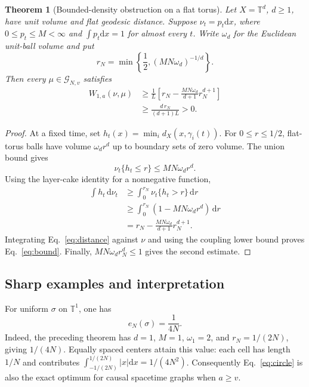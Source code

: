 \documentclass[aip,jmp,reprint,onecolumn,amsmath,amssymb]{revtex4-2}
\newcommand{\dd}{\mathrm{d}}
\newcommand{\T}{\mathbb T}
\newcommand{\G}{\mathcal G}
\newtheorem{theorem}{Theorem}[section]
\theoremstyle{definition}
\begin{document}
\begin{theorem}[Bounded-density obstruction on a flat torus]
Let $X=\T^d$, $d\ge1$, have unit volume and flat geodesic distance. Suppose $\nu_t=p_t\dd x$, where $0\le p_t\le M<\infty$ and $\int p_t\dd x=1$ for almost every $t$. Write $\omega_d$ for the Euclidean unit-ball volume and put
\begin{equation}
 r_N=\min\left\{\frac12,(MN\omega_d)^{-1/d}\right\}.
\end{equation}
Then every $\mu\in\G_{N,v}$ satisfies
\begin{align}
 W_{1,a}(\nu,\mu)
 &\ge\frac1L\left[r_N-\frac{MN\omega_d}{d+1}r_N^{d+1}\right]\label{eq:bound}\\
 &\ge\frac{d\,r_N}{(d+1)L}>0.
\end{align}
\end{theorem}
\begin{proof}
At a fixed time, set $h_t(x)=\min_i d_X(x,\gamma_i(t))$. For $0\le r\le1/2$, flat-torus balls have volume $\omega_dr^d$ up to boundary sets of zero volume. The union bound gives
\begin{equation}
 \nu_t\{h_t\le r\}\le MN\omega_dr^d.
\end{equation}
Using the layer-cake identity for a nonnegative function,
\begin{align}
 \int h_t\,\dd\nu_t
 &\ge\int_0^{r_N}\nu_t\{h_t>r\}\,\dd r\\
 &\ge\int_0^{r_N}(1-MN\omega_dr^d)\,\dd r\\
 &=r_N-\frac{MN\omega_d}{d+1}r_N^{d+1}.
\end{align}
Integrating Eq.~\eqref{eq:distance} against $\nu$ and using the coupling lower bound proves Eq.~\eqref{eq:bound}. Finally, $MN\omega_dr_N^d\le1$ gives the second estimate.
\end{proof}

\subsection{Sharp examples and interpretation}
For uniform $\sigma$ on $\T^1$, one has
\begin{equation}
 e_N(\sigma)=\frac1{4N}.
 \label{eq:circle}
\end{equation}
Indeed, the preceding theorem has $d=1$, $M=1$, $\omega_1=2$, and $r_N=1/(2N)$, giving $1/(4N)$. Equally spaced centers attain this value: each cell has length $1/N$ and contributes $\int_{-1/(2N)}^{1/(2N)}|x|\dd x=1/(4N^2)$. Consequently Eq.~\eqref{eq:circle} is also the exact optimum for causal spacetime graphs when $a\ge v$.
\end{document}
